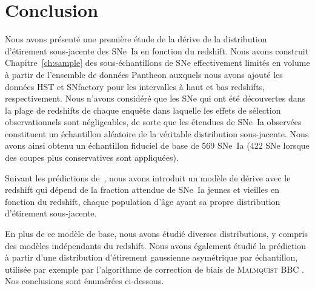 \documentclass[../main/main.tex]{subfiles}
\begin{document}
\section{Conclusion}\label{ssec:xccl}

Nous avons présenté une première étude de la dérive de la distribution
d'étirement sous-jacente des SNe~Ia en fonction du redshift. Nous avons
construit Chapitre~\ref{ch:sample} des sous-échantillons de SNe effectivement
limités en volume à partir de l'ensemble de données Pantheon \citep[][SDSS, PS1,
SNLS]{scolnic2018} auxquels nous avons ajouté les données HST et SNfactory
\citep{rigault2020} pour les intervalles à haut et bas redshifts,
respectivement. Nous n'avons considéré que les SNe qui ont été découvertes dans
la plage de redshifts de chaque enquête dans laquelle les effets de sélection
observationnels sont négligeables, de sorte que les étendues de SNe~Ia observées
constituent un échantillon aléatoire de la véritable distribution sous-jacente.
Nous avons ainsi obtenu un échantillon fiduciel de base de 569 SNe~Ia (422 SNe
lorsque des coupes plus conservatives sont appliquées). 

Suivant les prédictions de~\cite{rigault2020}, nous avons introduit un modèle de
dérive avec le redshift qui dépend de la fraction attendue de SNe~Ia
jeunes et vieilles en fonction du redshift, chaque population d'âge ayant sa
propre distribution d'étirement sous-jacente.

En plus de ce modèle de base, nous avons étudié diverses distributions, y
compris des modèles indépendants du redshift. Nous avons également étudié la
prédiction à partir d'une distribution d'étirement gaussienne asymétrique par
échantillon, utilisée par exemple par l'algorithme de correction de biais de
\textsc{Malmquist} BBC \citep{scolnic2016, kessler2017}. Nos conclusions sont
énumérées ci-dessous.
\end{document}
